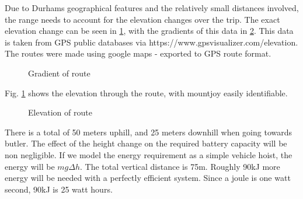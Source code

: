 \documentclass{article}
\begin{document}
Due to Durhams geographical features and the relatively small distances involved, the range needs to account for the elevation changes over the trip.
The exact elevation change can be seen in \ref{fig:route_el}, with the gradients of this data in \ref{fig:route_grad}.
This data is taken from GPS public databases via https://www.gpsvisualizer.com/elevation.
The routes were made using google maps - exported to GPS route format.
\begin{figure}[H]
    \centering
    \caption{Gradient of route}
    \label{fig:route_el}
\end{figure}
Fig. \ref{fig:route_el} shows the elevation through the route, with mountjoy easily identifiable. 
\begin{figure}[H]
    \centering
    \caption{Elevation of route}
    \label{fig:route_grad}
\end{figure}
There is a total of 50 meters uphill, and 25 meters downhill when going towards butler.
The effect of the height change on the required battery capacity will be non negligible.
If we model the energy requirement as a simple vehicle hoist, the energy will be $mg\Delta h$.
The total vertical distance is 75m.
Roughly 90kJ more energy will be needed with a perfectly efficient system.
Since a joule is one watt second, 90kJ is 25 watt hours.
\end{document}

